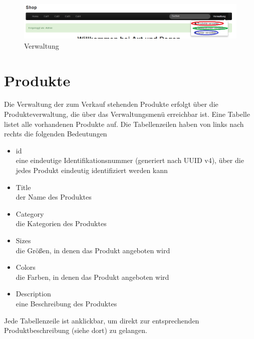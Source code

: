 \begin{figure}[h!]
  \centering
  \includegraphics[width=\textwidth]{img/Verwaltung.png}
  \caption{Verwaltung}
  \label{fig:Verwaltung}
\end{figure}


\section{Produkte}
Die Verwaltung der zum Verkauf stehenden Produkte erfolgt über die Produkteverwaltung, die über das Verwaltungsmenü erreichbar ist.  Eine Tabelle listet alle vorhandenen Produkte auf. Die Tabellenzeilen haben von links nach rechts die folgenden Bedeutungen
\begin{itemize}
  \item id \\
        eine eindeutige Identifikationsnummer (generiert nach UUID v4), über die jedes Produkt eindeutig identifiziert werden kann
  \vspace*{-0.5em}
  \item Title \\
        der Name des Produktes
  \vspace*{-0.5em}
  \item Category \\
        die Kategorien des Produktes
  \vspace*{-0.5em}
  \item Sizes \\
        die Größen, in denen das Produkt angeboten wird
  \vspace*{-0.5em}
  \item Colors \\
        die Farben, in denen das Produkt angeboten wird
  \vspace*{-0.5em}
  \item Description \\
        eine Beschreibung des Produktes
\end{itemize}
Jede Tabellenzeile ist anklickbar, um direkt zur entsprechenden Produktbeschreibung (siehe dort) zu gelangen.

